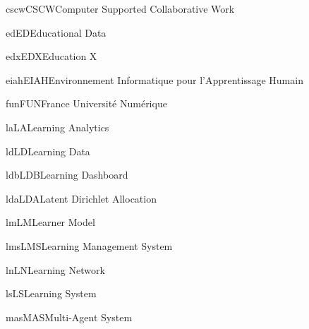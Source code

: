 \newacronym
{cscw}{CSCW}{Computer Supported Collaborative Work}

\newacronym
{ed}{ED}{Educational Data}

\newacronym
{edx}{EDX}{Education X}


\newacronym
{eiah}{EIAH}{Environnement Informatique pour l'Apprentissage Humain}

\newacronym
{fun}{FUN}{France Université Numérique}



\newacronym
{la}{LA}{Learning Analytics}

\newacronym
{ld}{LD}{Learning Data}

\newacronym
{ldb}{LDB}{Learning Dashboard}

\newacronym
{lda}{LDA}{Latent Dirichlet Allocation}

\newacronym
{lm}{LM}{Learner Model}

\newacronym
{lms}{LMS}{Learning Management System}

\newacronym
{ln}{LN}{Learning Network}

\newacronym
{ls}{LS}{Learning System}

\newacronym
{mas}{MAS}{Multi-Agent System}

